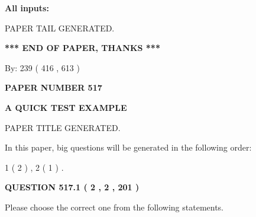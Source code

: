 \documentclass[12pt]{article}
\begin{document}
   
\noindent{}
   
   
   
   
\noindent\vspace{0.1in}\hspace{-0.08in} {\textbf{\Large{All inputs: }}}
   
   
   
   
   
   
 \vspace{0.2in}
 
   
   
\vspace{2.0in} PAPER TAIL GENERATED.
   
   
   
   
\vspace{1.0in} 
{\textbf{\large{ *** END OF PAPER, THANKS *** }}} 
   
   
\hspace{1.0in} By: 
 239 ( 416 ,  613 )
   
   
   
   
\newpage 
\setcounter{page}{ 
   517001 } 
   
   
   
   
 {\textbf{ \Large{ PAPER NUMBER  517  }}}
   
   
\vspace{0.2in}
   
   
   
   
   
   
   
   
 \vspace{0.2in}
{\LARGE {\textbf{ A QUICK TEST EXAMPLE}}}
   
   
 PAPER TITLE GENERATED.
   
   
   
\vspace{0.2in}
   
In this paper, big questions will be generated in the following order: 
   
   
   1 ( 2 )
 ,
   2 ( 1 )
 .
  
\vspace{0.2in}
  
{\textbf{\Large{QUESTION
517.1 
 ( 2 , 2 , 201 )
}}}
  
  
Please choose the correct one from the following statements.
 
\end{document}
